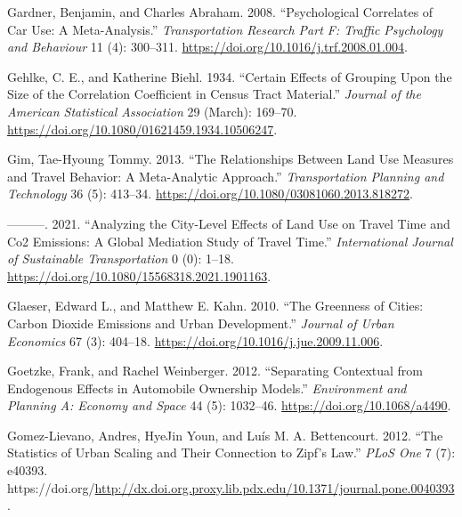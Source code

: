 \documentclass[
  12pt,
]{article}
\newlength{\cslhangindent}
\newlength{\cslentryspacingunit} %
\newenvironment{CSLReferences}[2] %
 {%
  \setlength{\parindent}{0pt}
  \ifodd #1
  \let\oldpar\par
  \def\par{\hangindent=\cslhangindent\oldpar}
  \fi
  \setlength{\parskip}{#2\cslentryspacingunit}
 }%
 {}
\begin{document}
\begin{CSLReferences}{1}{0}
\leavevmode{}%
Gardner, Benjamin, and Charles Abraham. 2008. {``Psychological Correlates of Car Use: {A} Meta-Analysis.''} \emph{Transportation Research Part F: Traffic Psychology and Behaviour} 11 (4): 300--311. \url{https://doi.org/10.1016/j.trf.2008.01.004}.

\leavevmode{}%
Gehlke, C. E., and Katherine Biehl. 1934. {``Certain {Effects} of {Grouping} Upon the {Size} of the {Correlation Coefficient} in {Census Tract Material}.''} \emph{Journal of the American Statistical Association} 29 (March): 169--70. \url{https://doi.org/10.1080/01621459.1934.10506247}.

\leavevmode{}%
Gim, Tae-Hyoung Tommy. 2013. {``The Relationships Between Land Use Measures and Travel Behavior: A Meta-Analytic Approach.''} \emph{Transportation Planning and Technology} 36 (5): 413--34. \url{https://doi.org/10.1080/03081060.2013.818272}.

\leavevmode{}%
---------. 2021. {``Analyzing the City-Level Effects of Land Use on Travel Time and {Co2} Emissions: A Global Mediation Study of Travel Time.''} \emph{International Journal of Sustainable Transportation} 0 (0): 1--18. \url{https://doi.org/10.1080/15568318.2021.1901163}.

\leavevmode{}%
Glaeser, Edward L., and Matthew E. Kahn. 2010. {``The Greenness of Cities: {Carbon} Dioxide Emissions and Urban Development.''} \emph{Journal of Urban Economics} 67 (3): 404--18. \url{https://doi.org/10.1016/j.jue.2009.11.006}.

\leavevmode{}%
Goetzke, Frank, and Rachel Weinberger. 2012. {``Separating {Contextual} from {Endogenous Effects} in {Automobile Ownership Models}.''} \emph{Environment and Planning A: Economy and Space} 44 (5): 1032--46. \url{https://doi.org/10.1068/a4490}.

\leavevmode{}%
Gomez-Lievano, Andres, HyeJin Youn, and Luís M. A. Bettencourt. 2012. {``The {Statistics} of {Urban Scaling} and {Their Connection} to {Zipf}'s {Law}.''} \emph{PLoS One} 7 (7): e40393. https://doi.org/\url{http://dx.doi.org.proxy.lib.pdx.edu/10.1371/journal.pone.0040393}.


\end{CSLReferences}
\end{document}
